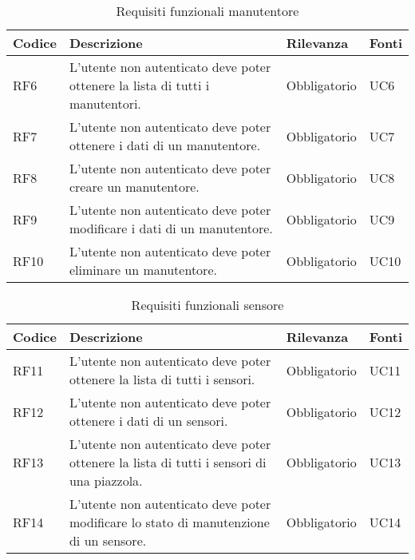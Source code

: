 \begin{table}[H]
    \begin{tabular}{|p{1cm}|p{6cm}|p{1.9cm}|p{1.8cm}|} 
    \hline
    Codice & Descrizione & Rilevanza &  Fonti \\ 
    \hline
    RF6 & L'utente non autenticato deve poter ottenere la lista di tutti i manutentori. & Obbligatorio & UC6 \\ 
    \hline
    RF7 & L'utente non autenticato deve poter ottenere i dati di un manutentore. & Obbligatorio & UC7 \\ 
    \hline
    RF8 & L'utente non autenticato deve poter creare un manutentore. & Obbligatorio & UC8 \\ 
    \hline
    RF9 & L'utente non autenticato deve poter modificare i dati di un manutentore. & Obbligatorio & UC9 \\
    \hline
    RF10 & L'utente non autenticato deve poter eliminare un manutentore. & Obbligatorio & UC10 \\ 
    \hline
    \end{tabular}
    \caption{Requisiti funzionali manutentore}
\end{table}
\clearpage
\begin{table}[H]
    \begin{tabular}{|p{1cm}|p{6cm}|p{1.9cm}|p{1.8cm}|} 
    \hline
    Codice & Descrizione & Rilevanza &  Fonti \\ 
    \hline
    RF11 & L'utente non autenticato deve poter ottenere la lista di tutti i sensori. & Obbligatorio & UC11 \\ 
    \hline
    RF12 & L'utente non autenticato deve poter ottenere i dati di un sensori. & Obbligatorio & UC12 \\ 
    \hline
    RF13 & L'utente non autenticato deve poter ottenere la lista di tutti i sensori di una piazzola. & Obbligatorio & UC13 \\ 
    \hline
    RF14 & L'utente non autenticato deve poter modificare lo stato di manutenzione di un sensore. & Obbligatorio & UC14 \\ 
    \hline
    \end{tabular}
    \caption{Requisiti funzionali sensore}
\end{table}

